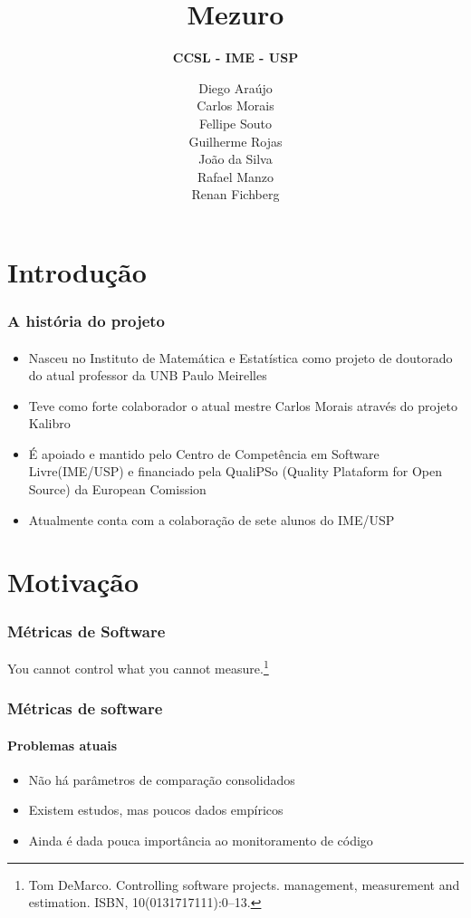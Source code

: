 \documentclass{beamer}
\title{
       \textbf{Mezuro} \\
      }
\subtitle{
		\textbf{CCSL - IME - USP}
		}
\author{
        Diego Araújo \\
        Carlos Morais \\
        Fellipe Souto \\
        Guilherme Rojas \\
        João da Silva \\
        Rafael Manzo \\
        Renan Fichberg
       }
\begin{document}
\maketitle

\section{Introdução}

\begin{frame}
  \frametitle{A história do projeto}
  \framesubtitle{}
  
  \begin{itemize}
    \item Nasceu no Instituto de Matemática e Estatística como projeto de doutorado do atual professor da UNB Paulo Meirelles
    \item Teve como forte colaborador o atual mestre Carlos Morais através do projeto Kalibro
    \item É apoiado e mantido pelo Centro de Competência em Software Livre(IME/USP) e financiado pela QualiPSo (Quality Plataform for Open Source) da European Comission
    \item Atualmente conta com a colaboração de sete alunos do IME/USP
 
  \end{itemize}

\end{frame}

\section{Motivação}
\begin{frame}

  \frametitle{Métricas de Software}
  \begin{center}
  You cannot control what you cannot measure.\footnote{Tom DeMarco. Controlling software projects. management, measurement and estimation. ISBN, 10(0131717111):0–13.}  
  \end{center}


\end{frame}


\begin{frame}
  \frametitle{Métricas de software}
  \framesubtitle{Problemas atuais}
  
  \begin{itemize}
    \item Não há parâmetros de comparação consolidados
    \item Existem estudos, mas poucos dados empíricos
    \item Ainda é dada pouca importância ao monitoramento de código
  \end{itemize}
\end{frame}
\end{document}
